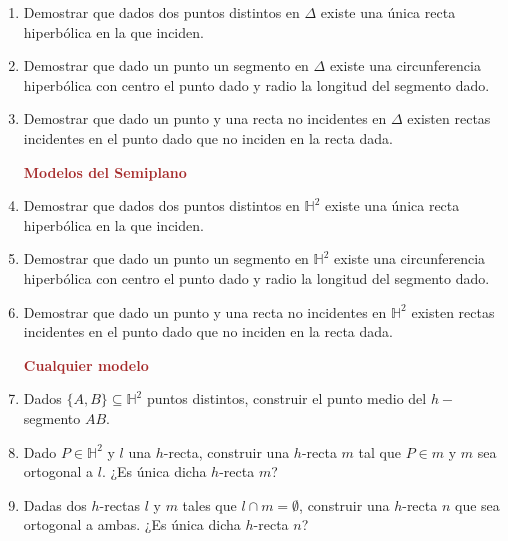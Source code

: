\documentclass[11pt]{report}
\numberwithin{section}{chapter}
\newcommand{\h}{\mathbb H}
\begin{document}
\begin{enumerate}
\item Demostrar que dados dos puntos distintos en $\Delta$ existe una única recta hiperbólica en la que inciden.

\item Demostrar que dado un punto un segmento en $\Delta$ existe una circunferencia hiperbólica con centro el punto dado y radio la longitud del segmento dado.

\item Demostrar que dado un punto y una recta no incidentes en $\Delta$ existen rectas incidentes en el punto dado que no inciden en la recta dada.


\begin{center}
\textcolor{brown}{\textbf{\large Modelos del Semiplano}}
\end{center}

\item Demostrar que dados dos puntos distintos en $\h^2$ existe una única recta hiperbólica en la que inciden.

\item Demostrar que dado un punto un segmento en $\h^2$ existe una circunferencia hiperbólica con centro el punto dado y radio la longitud del segmento dado.

\item Demostrar que dado un punto y una recta no incidentes en $\h^2$ existen rectas incidentes en el punto dado que no inciden en la recta dada.


\begin{center}
\textcolor{brown}{\textbf{\large Cualquier modelo}}
\end{center}


\item Dados $\{A,B\} \subseteq \h^2$ puntos distintos, construir el punto medio del $h-$segmento $AB$.

\item Dado $P \in \h^2$ y $l$ una $h$-recta, construir una $h$-recta $m$ tal que $P \in m$ y $m$ sea ortogonal a $l$. ¿Es única dicha $h$-recta $m$?


\item Dadas dos $h$-rectas $l$ y $m$ tales que $l \cap m = \emptyset$, construir una $h$-recta $n$ que sea ortogonal a ambas. ¿Es única dicha $h$-recta $n$?


\end{enumerate}
\end{document}
